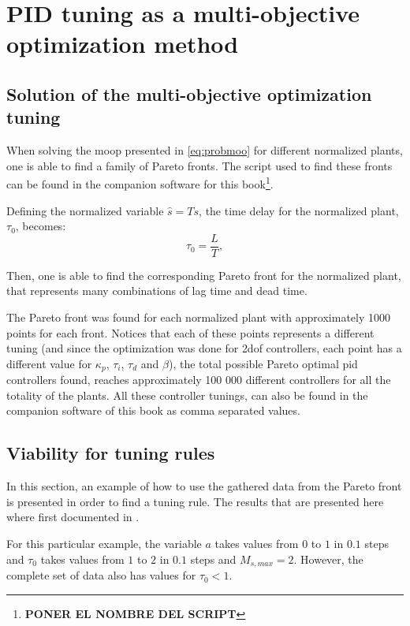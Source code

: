 \chapter{PID tuning as a multi-objective optimization method}
\label{chap:PIDMOOP}

\section{Solution of the multi-objective optimization tuning}
\label{sec:SolMOOP}
When solving the \gls{moop} presented in \eqref{eq:probmoo} for different normalized plants, one is able to find a family of Pareto fronts. The script used to find these fronts can be found in the companion software for this book\footnote{\textbf{PONER EL NOMBRE DEL SCRIPT}}.

Defining the normalized variable $\hat{s}=T s$, the time delay for the normalized plant, $\tau_0$, becomes:
\begin{equation}
\tau_0 = \frac{L}{T},
\label{eq:tauNorm}
\end{equation}
%

Then, one is able to find the corresponding Pareto front for the normalized plant, that represents many combinations of lag time and dead time.
%

The Pareto front was found for each normalized plant with approximately 1000 points for each front. Notices that each of these points represents a different tuning (and since the optimization was done for \gls{2dof} controllers, each point has a different value for $\kappa_p$, $\tau_i$, $\tau_d$ and $\beta$), the total possible Pareto optimal \gls{pid} controllers found, reaches approximately 100 000 different controllers for all the totality of the plants. All these controller tunings, can also be found in the companion software of this book as comma separated values.

\section{Viability for tuning rules}
\label{sec:TuningRulesMOOP}
In this section, an example of how to use the gathered data from the Pareto front is presented in order to find a tuning rule. The results that are presented here where first documented in \cite{Moya2017}.

For this particular example, the variable $a$ takes values from $0$ to $1$ in $0.1$ steps and $\tau_0$ takes values from $1$ to $2$ in $0.1$ steps and $M_{s,max}=2$. However, the complete set of data also has values for $\tau_0 < 1$.

